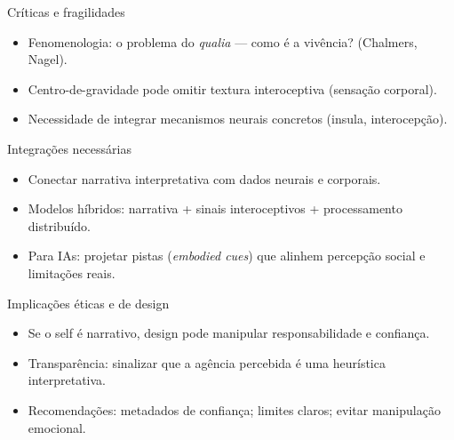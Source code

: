 \documentclass[aspectratio=169,12pt]{beamer}
\begin{document}
\begin{frame}{Críticas e fragilidades}
\begin{itemize}
\item Fenomenologia: o problema do \textit{qualia} — como é a vivência? (Chalmers, Nagel).
\item Centro-de-gravidade pode omitir textura interoceptiva (sensação corporal).
\item Necessidade de integrar mecanismos neurais concretos (insula, interocepção).
\end{itemize}
\end{frame}


\begin{frame}{Integrações necessárias}
\begin{itemize}
\item Conectar narrativa interpretativa com dados neurais e corporais.
\item Modelos híbridos: narrativa + sinais interoceptivos + processamento distribuído.
\item Para IAs: projetar pistas (\textit{embodied cues}) que alinhem percepção social e limitações reais.
\end{itemize}
\end{frame}
\begin{frame}{Implicações éticas e de design}
\begin{itemize}
\item Se o self é narrativo, design pode manipular responsabilidade e confiança.
\item Transparência: sinalizar que a agência percebida é uma heurística interpretativa.
\item Recomendações: metadados de confiança; limites claros; evitar manipulação emocional.
\end{itemize}
\end{frame}
\end{document}
